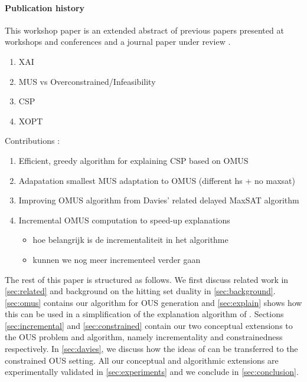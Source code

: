 {{\paragraph*{Publication history} This workshop paper is an extended abstract of previous papers presented at workshops and conferences \cite{claesuser,DBLP:conf/bnaic/ClaesBCGG19,ecai/BogaertsGCG20} and a journal paper under review \cite{bogaerts2020framework}.
}

\begin{enumerate}
    \item XAI
    \item MUS vs Overconstrained/Infeasibility
    \item CSP
    \item XOPT
\end{enumerate}

Contributions : 
\begin{enumerate}
    \item Efficient, greedy algorithm for explaining CSP based on OMUS 
    \item Adapatation smallest MUS adaptation to OMUS (different hs + no maxsat) 
    \item Improving OMUS algorithm from Davies' related delayed MaxSAT algorithm 
    \item Incremental OMUS computation to speed-up explanations
    \begin{itemize}
        \item hoe belangrijk is de incrementaliteit in het algorithme
        \item kunnen  we nog meer incrementeel verder gaan
    \end{itemize}
\end{enumerate}
}


The rest of this paper is structured as follows. We first discuss related work in \cref{sec:related} and background on the hitting set duality in \cref{sec:background}. \cref{sec:omus} contains our algorithm for OUS generation and \cref{sec:explain} shows how this can be used in a simplification of the explanation algorithm of \citet{ecai/BogaertsGCG20}. 
Sections \ref{sec:incremental} and \ref{sec:constrained} contain our two conceptual extensions to the OUS problem and algorithm, namely incrementality and constrainedness respectively. 
 In \cref{sec:davies}, we discuss how the ideas of \citet{davies} can be transferred to the constrained OUS setting. 
All our conceptual and algorithmic extensions are experimentally validated in \cref{sec:experiments} and we conclude in \cref{sec:conclusion}.


